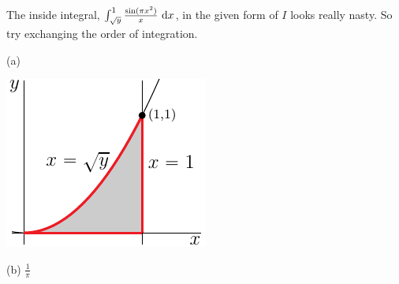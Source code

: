 \begin{hint}
The inside integral, $\int_{\sqrt{y}}^1 \frac{\sin(\pi x^2)}{x}\ \mathrm{d}x$,
in the given form of $I$ looks really nasty.  So try exchanging
the order of integration.
\end{hint}

\begin{answer}
(a)
\begin{center}
     \includegraphics{fig/OE08D_6.pdf}
\end{center}

(b) $\frac{1}{\pi}$
\end{answer}

